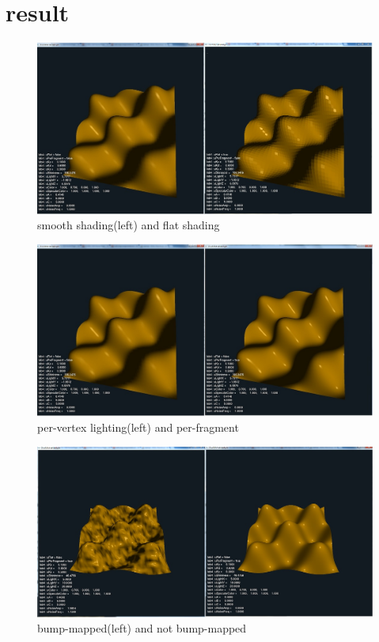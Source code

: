 \documentclass[12pt,letterpaper]{article}
\begin{document}
\section{result}

\begin{figure}[p]
    \centering
    \includegraphics[width=1.0\textwidth]{1.jpg}
    \caption{smooth shading(left) and flat shading}
\end{figure}

\begin{figure}[p]
    \centering
    \includegraphics[width=1.0\textwidth]{2.jpg}
    \caption{per-vertex lighting(left) and per-fragment}
\end{figure}

\begin{figure}[p]
    \centering
    \includegraphics[width=1.0\textwidth]{3.jpg}
    \caption{bump-mapped(left) and not bump-mapped}
\end{figure}
\end{document}
